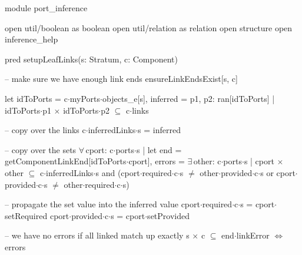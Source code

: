 module port_inference

open util/boolean as boolean
open util/relation as relation
open structure
open inference_help

pred setupLeafLinks(s: Stratum, c: Component)
{
  -- make sure we have enough link ends
  ensureLinkEndsExist[s, c]

  let
    idToPorts = c$\cdot$myPorts$\cdot$objects_e[s],
    inferred =
      { p1, p2: ran[idToPorts] |
        idToPorts$\cdot$p1$\,\times\,$idToPorts$\cdot$p2 $\subseteq$ c$\cdot$links }
  {
    -- copy over the links
    c$\cdot$inferredLinks$\cdot$s = inferred

    -- copy over the sets
    $\forall\,$cport: c$\cdot$ports$\cdot$s |
    let
      end = getComponentLinkEnd[idToPorts$\cdot$cport],
      errors =
        $\exists\,$other: c$\cdot$ports$\cdot$s |
          cport$\,\times\,$other $\subseteq$ c$\cdot$inferredLinks$\cdot$s and
            (cport$\cdot$required$\cdot$c$\cdot$s $\neq$ other$\cdot$provided$\cdot$c$\cdot$s or
             cport$\cdot$provided$\cdot$c$\cdot$s $\neq$ other$\cdot$required$\cdot$c$\cdot$s)
    {
      -- propagate the set value into the inferred value
      cport$\cdot$required$\cdot$c$\cdot$s = cport$\cdot$setRequired
      cport$\cdot$provided$\cdot$c$\cdot$s = cport$\cdot$setProvided
  
      -- we have no errors if all linked match up exactly
      s$\,\times\,$c $\subseteq$ end$\cdot$linkError $\Longleftrightarrow$ errors
    }
  }
}

